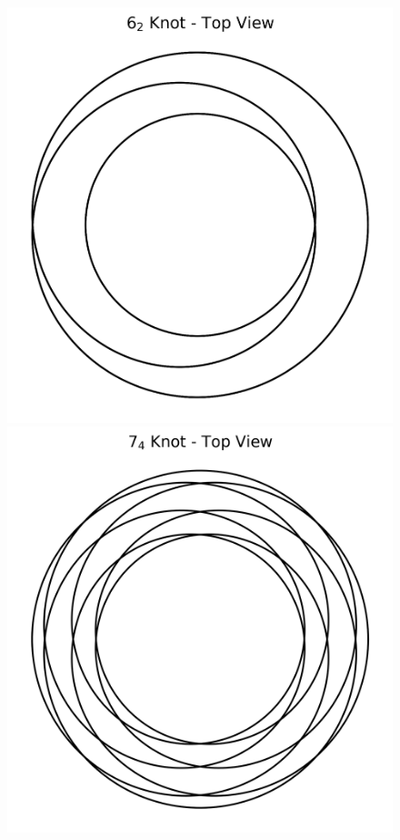 \documentclass[preprint]{revtex4-2}
\begin{document}
    \begin{figure}[H]
        \centering
        \begin{minipage}{0.25\textwidth}
            \centering
            \includegraphics[width=\textwidth]{knot_6_2_topview}
        \end{minipage}
        \hspace{1em}
        \begin{minipage}{0.25\textwidth}
            \centering
            \includegraphics[width=\textwidth]{knot_7_4_topview}

\end{minipage}
\end{figure}
\end{document}
